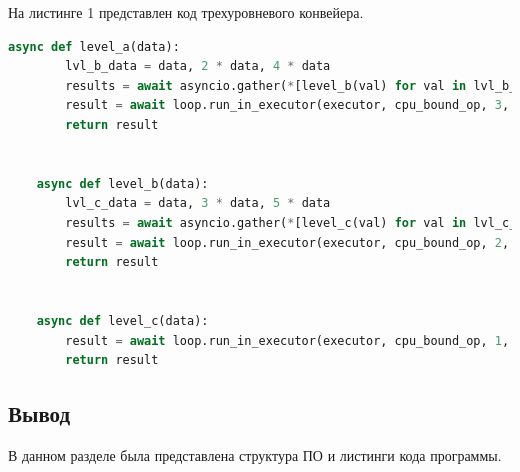 \documentclass[a4paper, 12pt]{article}
\begin{document}
\begin{flushleft}
	\lstset{style=mystyle}

	\hspace*{5mm} На листинге 1 представлен код трехуровневого конвейера.
	\begin{lstlisting}[language=Python, caption = Конвейерный алгоритм]
	async def level_a(data):
		lvl_b_data = data, 2 * data, 4 * data
		results = await asyncio.gather(*[level_b(val) for val in lvl_b_data]) 
		result = await loop.run_in_executor(executor, cpu_bound_op, 3, *results)
		return result
		
		
	async def level_b(data):
		lvl_c_data = data, 3 * data, 5 * data
		results = await asyncio.gather(*[level_c(val) for val in lvl_c_data])
		result = await loop.run_in_executor(executor, cpu_bound_op, 2, *results)
		return result
		
		
	async def level_c(data):
		result = await loop.run_in_executor(executor, cpu_bound_op, 1, data)
		return result
	\end{lstlisting}
	
	\subsection{Вывод}
	\hspace*{5mm} В данном разделе была представлена структура ПО и листинги кода программы. 
	
\end{flushleft}

\newpage
\end{document}
